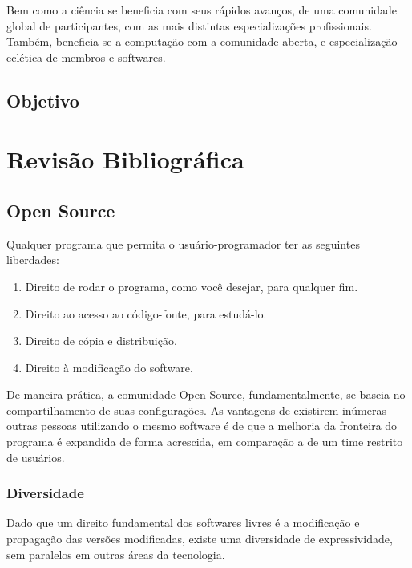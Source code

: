 \documentclass[
12pt,				%
openright,			%
oneside,			%
a4paper,			%
english,			%
french,				%
spanish,			%
brazil,				%
]{abntex2}
\begin{document}
Bem como a ciência se beneficia com seus rápidos avanços, de uma comunidade global de participantes, com as mais distintas especializações profissionais. Também, beneficia-se a computação com a comunidade aberta, e especialização eclética de membros e softwares.



\section{Objetivo}


\chapter{Revisão Bibliográfica}
\section{Open Source}
\label{sec:opensource}
Qualquer programa que permita o usuário-programador ter as seguintes liberdades:

\begin{enumerate}
\item Direito de rodar o programa, como você desejar, para qualquer fim.
\item Direito ao acesso ao código-fonte, para estudá-lo.
\item Direito de cópia e distribuição.
\item Direito à modificação do software.
\end{enumerate}

De maneira prática, a comunidade Open Source, fundamentalmente, se baseia no compartilhamento de suas configurações. As vantagens de existirem inúmeras outras pessoas utilizando o mesmo software é de que a melhoria da fronteira do programa é expandida de forma acrescida, em comparação a de um time restrito de usuários.

\subsection{Diversidade}
\label{sec:diversidade}

Dado que um direito fundamental dos softwares livres é a modificação e propagação das versões modificadas, existe uma diversidade de expressividade, sem paralelos em outras áreas da tecnologia.
\end{document}
